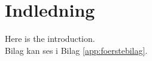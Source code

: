 \chapter{Indledning}\label{ch:indledning}
Here is the introduction. \cite{Mittelbach2005} \\

Bilag kan ses i Bilag \ref{app:foerstebilag}.
